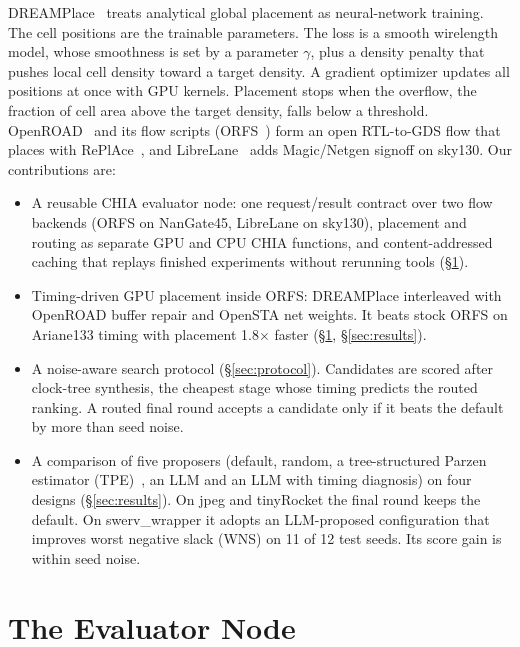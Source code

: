 \documentclass[sigconf]{acmart}
\begin{document}
DREAMPlace~\cite{dreamplace} treats analytical global placement as
neural-network training. The cell positions are the trainable parameters. The
loss is a smooth wirelength model, whose smoothness is set by a parameter
$\gamma$, plus a density penalty that pushes local cell density toward a
target density. A gradient optimizer updates all positions at once with GPU
kernels. Placement stops when the overflow, the fraction of cell area above
the target density, falls below a threshold. OpenROAD~\cite{openroad} and its
flow scripts (ORFS~\cite{orfs}) form an open RTL-to-GDS flow that places with
RePlAce~\cite{replace}, and LibreLane~\cite{librelane} adds Magic/Netgen
signoff on sky130. Our contributions are:
\begin{itemize}
  \item A reusable CHIA evaluator node: one request/result contract over two
    flow backends (ORFS on NanGate45, LibreLane on sky130), placement and
    routing as separate GPU and CPU CHIA functions, and content-addressed
    caching that replays finished experiments without rerunning tools
    (\S\ref{sec:node}).
  \item Timing-driven GPU placement inside ORFS: DREAMPlace interleaved with
    OpenROAD buffer repair and OpenSTA net weights. It beats stock ORFS on
    Ariane133 timing with placement 1.8$\times$ faster (\S\ref{sec:node},
    \S\ref{sec:results}).
  \item A noise-aware search protocol (\S\ref{sec:protocol}). Candidates are
    scored after clock-tree synthesis, the cheapest stage whose timing
    predicts the routed ranking. A routed final round accepts a candidate only
    if it beats the default by more than seed noise.
  \item A comparison of five proposers (default, random, a tree-structured Parzen
    estimator (TPE)~\cite{tpe}, an
    LLM and an LLM with timing diagnosis) on four designs
    (\S\ref{sec:results}). On jpeg and tinyRocket the final round keeps the
    default. On swerv\_wrapper it adopts an LLM-proposed configuration that
    improves worst negative slack (WNS) on 11 of 12 test seeds. Its score gain
    is within seed noise.
\end{itemize}


\section{The Evaluator Node}
\label{sec:node}
\end{document}
